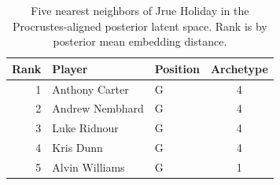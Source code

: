\begin{table}[htbp]
  \centering\small
  \begin{tabular}{rllc}
    \toprule
    Rank & Player & Position & Archetype \\
    \midrule
    1 & Anthony Carter & G & 4 \\
    2 & Andrew Nembhard & G & 4 \\
    3 & Luke Ridnour & G & 4 \\
    4 & Kris Dunn & G & 4 \\
    5 & Alvin Williams & G & 1 \\
    \bottomrule
  \end{tabular}
  \caption{Five nearest neighbors of Jrue Holiday in the Procrustes-aligned posterior latent space. Rank is by posterior mean embedding distance.}
  \label{tab:Jrue_Holiday_neighbors}
\end{table}

